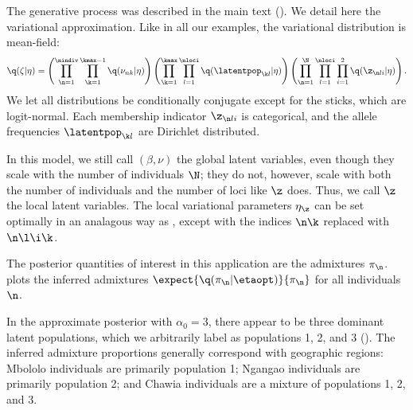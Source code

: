 The generative process was described in the main text ().
We detail here the variational approximation.
Like in all our examples, the variational distribution is mean-field:
\begin{align*}
\q(\zeta \vert \eta) =
    \left(
    \prod_{\n=1}^{\nindiv}\prod_{\k=1}^{\kmax - 1}
    \q(\nu_{nk} \vert \eta) \right)
    \left(\prod_{\k=1}^{\kmax}\prod_{l=1}^{\nloci}
    \q(\latentpop_{\k l} \vert \eta) \right)
    \left( \prod_{\n=1}^{\N} \prod_{l=1}^{\nloci} \prod_{i=1}^{2} \q(\z_{\n l i} \vert \eta) \right).
\end{align*}
We let all distributions be conditionally conjugate except for the sticks,
which are logit-normal.
Each membership indicator $\z_{\n l i}$ is categorical, and the
allele frequencies $\latentpop_{\k l}$ are Dirichlet distributed.

In this model, we still call $(\beta, \nu)$ the global latent variables, even though they scale
with the number of individuals $\N$;
they do not, however, scale with both the number of individuals and the number of loci
like $\z$ does. Thus, we call $\z$ the local latent variables.
The local variational parameters $\eta_\z$ can be set optimally in
an analagous way as , except with the
indices $\n\k$ replaced with $\n\l\i\k$.

The posterior quantities of interest in this application are the admixtures
$\pi_\n$.  plots the inferred admixtures
$\expect{\q(\pi_\n \vert \etaopt)}{\pi_\n}$ for all individuals $\n$.

In the approximate posterior with $\alpha_0 = 3$, there appear to be three dominant
latent populations, which we arbitrarily label as populations 1, 2, and 3
(). The inferred admixture proportions generally
correspond with geographic regions: Mbololo individuals are primarily population
1; Ngangao individuals are primarily population 2; and Chawia individuals are a
mixture of populations 1, 2, and 3.

\StructureInitialFit
